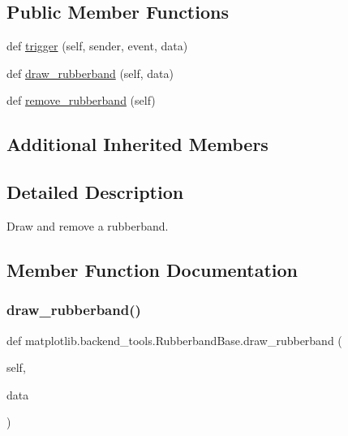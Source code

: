 \subsection*{Public Member Functions}
\begin{DoxyCompactItemize}
\item 
def \hyperlink{classmatplotlib_1_1backend__tools_1_1RubberbandBase_af3efd51b006e17bdb154aa9b328f3c10}{trigger} (self, sender, event, data)
\item 
def \hyperlink{classmatplotlib_1_1backend__tools_1_1RubberbandBase_a3e194dd5ae6a34ead76d2c1c7ade7e2f}{draw\+\_\+rubberband} (self, data)
\item 
def \hyperlink{classmatplotlib_1_1backend__tools_1_1RubberbandBase_aeae8c88c12e595eaa947bd7548ed05c2}{remove\+\_\+rubberband} (self)
\end{DoxyCompactItemize}
\subsection*{Additional Inherited Members}


\subsection{Detailed Description}
\begin{DoxyVerb}Draw and remove a rubberband.\end{DoxyVerb}
 

\subsection{Member Function Documentation}
\mbox{\label{classmatplotlib_1_1backend__tools_1_1RubberbandBase_a3e194dd5ae6a34ead76d2c1c7ade7e2f}} 
\subsubsection{\texorpdfstring{draw\+\_\+rubberband()}{draw\_rubberband()}}
{\footnotesize\ttfamily def matplotlib.\+backend\+\_\+tools.\+Rubberband\+Base.\+draw\+\_\+rubberband (\begin{DoxyParamCaption}\item[{}]{self,  }\item[{}]{data }\end{DoxyParamCaption})}

